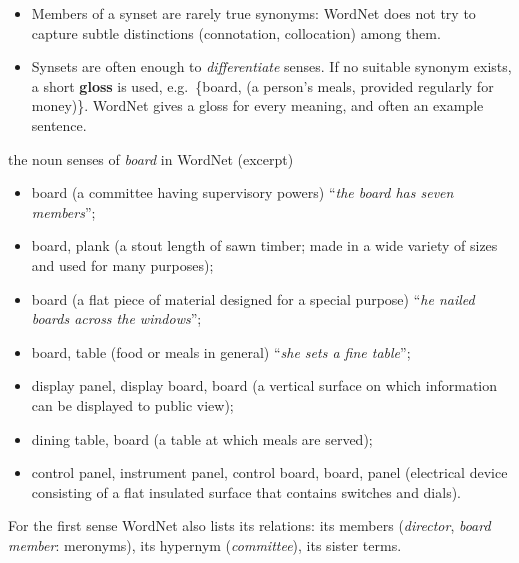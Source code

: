 \begin{itemize}[nosep]
  \item Members of a synset are rarely true synonyms: WordNet does not try to capture
        subtle distinctions (connotation, collocation) among them.
  \item Synsets are often enough to \emph{differentiate} senses. If no suitable synonym
        exists, a short \textbf{gloss} is used, e.g.\ \{board, (a person's meals,
        provided regularly for money)\}. WordNet gives a gloss for every meaning, and
        often an example sentence.
\end{itemize}

\begin{nbexample}{the noun senses of \emph{board} in WordNet (excerpt)}
\small
\begin{itemize}[nosep]
  \item board (a committee having supervisory powers) ``\emph{the board has seven
        members}'';
  \item board, plank (a stout length of sawn timber; made in a wide variety of sizes
        and used for many purposes);
  \item board (a flat piece of material designed for a special purpose) ``\emph{he
        nailed boards across the windows}'';
  \item board, table (food or meals in general) ``\emph{she sets a fine table}'';
  \item display panel, display board, board (a vertical surface on which information
        can be displayed to public view);
  \item dining table, board (a table at which meals are served);
  \item control panel, instrument panel, control board, board, panel (electrical device
        consisting of a flat insulated surface that contains switches and dials).
\end{itemize}
For the first sense WordNet also lists its relations: its members (\emph{director},
\emph{board member}: meronyms), its hypernym (\emph{committee}), its sister terms.
\end{nbexample}

